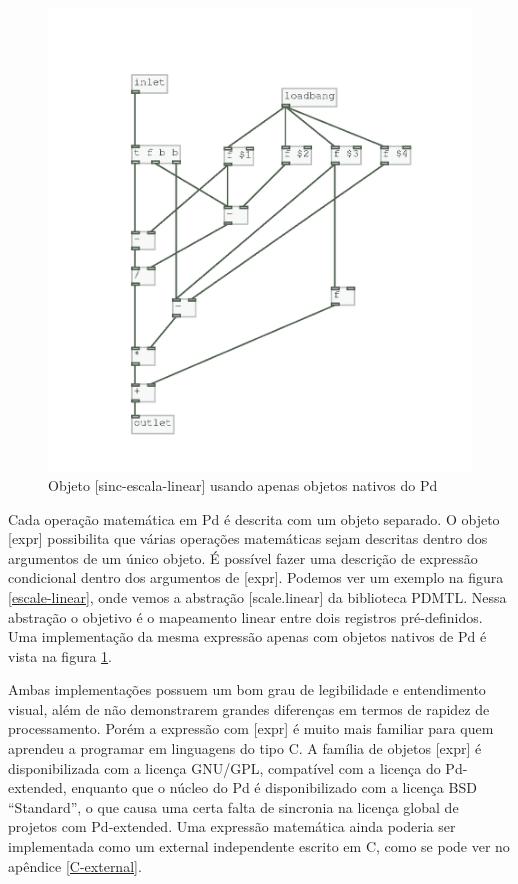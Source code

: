 \documentclass{ppgmus}
\begin{document}
\begin{figure}
\includegraphics[scale=.6]{sinc-escala-linear}
\caption{Objeto [sinc-escala-linear] usando apenas objetos nativos do Pd}
\label{sinc-linear}
\end{figure}

Cada operação matemática em Pd é descrita com um objeto separado.
O objeto [expr] possibilita que várias operações matemáticas sejam
descritas dentro dos argumentos de um único objeto.
É possível fazer uma descrição de expressão condicional dentro
dos argumentos de [expr]. Podemos ver um exemplo na figura \ref{escale-linear},
onde vemos a abstração [scale.linear] da biblioteca PDMTL. Nessa abstração
o objetivo é o mapeamento linear entre dois registros pré-definidos. Uma
implementação da mesma expressão apenas com objetos nativos de Pd é
vista na figura \ref{sinc-linear}.

Ambas implementações possuem um bom grau de legibilidade e entendimento
visual, além de não demonstrarem grandes diferenças em termos
de rapidez de processamento. Porém a expressão com [expr] é muito mais familiar para quem aprendeu
a programar em linguagens do tipo C. A família de objetos [expr] é disponibilizada
com a licença GNU/GPL, compatível com a licença do Pd-extended, enquanto que o núcleo do Pd é 
disponibilizado com a licença BSD ``Standard'', o
que causa uma certa falta de sincronia na licença global de projetos com Pd-extended. 
Uma expressão matemática ainda poderia ser implementada
como um external independente escrito em C, como se pode ver no apêndice \ref{C-external}.
\end{document}
